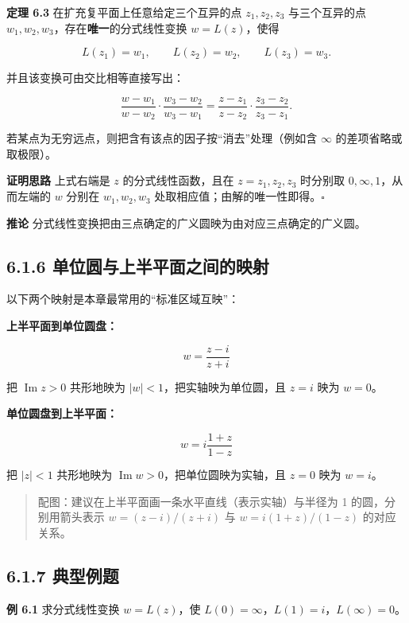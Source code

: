 \textbf{定理 6.3} 在扩充复平面上任意给定三个互异的点 \(z_1,z_2,z_3\)
与三个互异的点 \(w_1,w_2,w_3\)，存在\textbf{唯一}的分式线性变换
\(w=L(z)\)，使得

\[
L(z_1)=w_1,\qquad L(z_2)=w_2,\qquad L(z_3)=w_3 .
\]

并且该变换可由交比相等直接写出：

\[
\frac{w-w_1}{w-w_2}\cdot\frac{w_3-w_2}{w_3-w_1}
=
\frac{z-z_1}{z-z_2}\cdot\frac{z_3-z_2}{z_3-z_1}.
\]

若某点为无穷远点，则把含有该点的因子按``消去''处理（例如含 \(\infty\)
的差项省略或取极限）。

\textbf{证明思路} 上式右端是 \(z\) 的分式线性函数，且在
\(z=z_1,z_2,z_3\) 时分别取 \(0,\infty,1\)，从而左端的 \(w\) 分别在
\(w_1,w_2,w_3\) 处取相应值；由解的唯一性即得。\(\square\)

\textbf{推论}
分式线性变换把由三点确定的广义圆映为由对应三点确定的广义圆。

\subsection{6.1.6
单位圆与上半平面之间的映射}\label{ux5355ux4f4dux5706ux4e0eux4e0aux534aux5e73ux9762ux4e4bux95f4ux7684ux6620ux5c04}

以下两个映射是本章最常用的``标准区域互映''：

\textbf{上半平面到单位圆盘：}

\[
w = \frac{z-i}{z+i}
\]

把 \(\operatorname{Im}z>0\) 共形地映为 \(|w|<1\)，把实轴映为单位圆，且
\(z=i\) 映为 \(w=0\)。

\textbf{单位圆盘到上半平面：}

\[
w = i\frac{1+z}{1-z}
\]

把 \(|z|<1\) 共形地映为 \(\operatorname{Im}w>0\)，把单位圆映为实轴，且
\(z=0\) 映为 \(w=i\)。

\begin{quote}
配图：建议在上半平面画一条水平直线（表示实轴）与半径为 1
的圆，分别用箭头表示 \(w=(z-i)/(z+i)\) 与 \(w=i(1+z)/(1-z)\)
的对应关系。
\end{quote}

\subsection{6.1.7 典型例题}\label{ux5178ux578bux4f8bux9898-2}

\textbf{例 6.1} 求分式线性变换 \(w=L(z)\)，使
\(L(0)=\infty\)，\(L(1)=i\)，\(L(\infty)=0\)。

